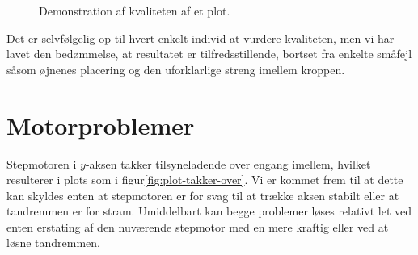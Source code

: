 \begin{figure}[htbp]
  \centering
  \qquad
  \caption{Demonstration af kvaliteten af et plot.}
  \label{fig:plot-tux}
\end{figure}

Det er selvfølgelig op til hvert enkelt individ at vurdere kvaliteten,
men vi har lavet den bedømmelse, at resultatet er tilfredsstillende,
bortset fra enkelte småfejl såsom øjnenes placering og den
uforklarlige streng imellem kroppen.



\section{Motorproblemer}

Stepmotoren i $y$-aksen takker tilsyneladende over engang imellem,
hvilket resulterer i plots som i figur\vref{fig:plot-takker-over}.
Vi er kommet frem til at dette kan skyldes enten at stepmotoren er
for svag til at trække aksen stabilt eller at tandremmen er for stram.
Umiddelbart kan begge problemer løses relativt let ved enten erstating
af den nuværende stepmotor med en mere kraftig eller ved at løsne tandremmen.

